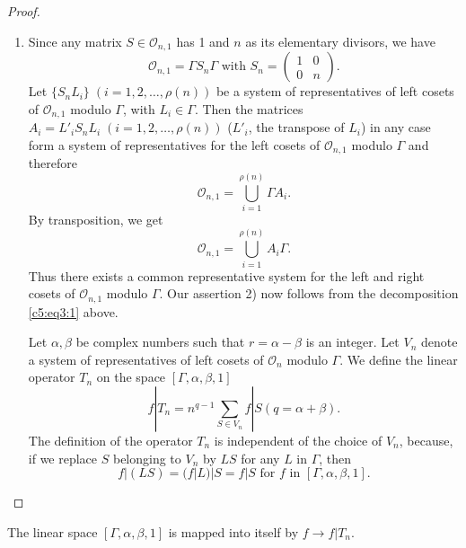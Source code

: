 \begin{proof}
\begin{enumerate}
\item Since any matrix $S\in \mathcal{O}_{n,1}$ has 1 and $n$
  as its elementary divisors, we have 
$$
\mathcal{O}_{n,1} = \Gamma S_n \Gamma \text{ with } S_n
= \begin{pmatrix}
1 & 0\\0 & n 
\end{pmatrix}.
$$
Let $\{S_n L_i\} \; (i=1,2,\ldots, \rho(n))$ be a system of
representatives of left cosets of $\mathcal{O}_{n,1}$ modulo $\Gamma$,
with $L_i\in \Gamma$. Then the matrices $A_i=L'_i S_n L_i
\; (i=1,2,\ldots, \rho(n))$ ($L'_i$, the transpose of $L_i$) in any case
form a system of representatives for the left cosets of
$\mathcal{O}_{n,1}$ modulo $\Gamma$ and therefore 
$$
\mathcal{O}_{n,1} = \bigcup^{\rho(n)}_{i=1} \Gamma A_i.
$$
By transposition, we get 
$$
\mathcal{O}_{n,1} = \bigcup^{\rho(n)}_{i=1} A_i \Gamma.
$$
Thus \pageoriginale there exists a common representative system for
the left and right cosets of $\mathcal{O}_{n,1}$ modulo $\Gamma$. Our
assertion 2) now follows from the decomposition \eqref{c5:eq3:1} above.

Let $\alpha,\beta$ be complex numbers such that $r=\alpha-\beta$ is an
integer. Let $V_n$ denote a system of representatives of left cosets
of $\mathcal{O}_n$ modulo $\Gamma$. We define the linear operator
$T_n$ on the space $[\Gamma, \alpha, \beta,1]$
\begin{equation*}
f|T_n = n^{q-1} \sum_{S\in V_n} f|S (q=\alpha+\beta).\tag{2}\label{c5:eq3:2} 
\end{equation*}
The definition of the operator $T_n$ is independent of the choice of
$V_n$, because, if we replace $S$ belonging to $V_n$ by $LS$ for any
$L$ in $\Gamma$, then
$$
f|(LS) = (f|L)|S = f|S \text{ for } f \text{ in } [\Gamma, \alpha,
  \beta, 1]. 
$$
\end{enumerate}
\end{proof}

\begin{thm}\label{chap5:thm37}
The linear space $[\Gamma, \alpha, \beta, 1]$ is mapped into itself by
$f\to f|T_n$.
\end{thm}

